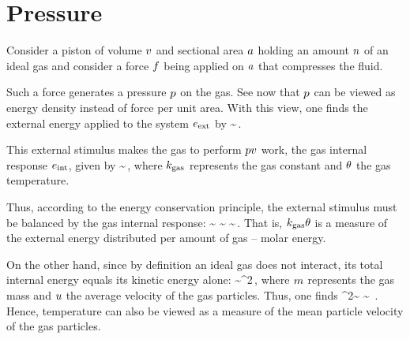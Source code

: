 \section{Pressure}
Consider a piston of volume $v$ and sectional area $a$ holding an amount $n$ of an ideal gas and consider a force $f$ being applied on $a$ that compresses the fluid. 

Such a force generates a pressure $p$ on the gas. See now that $p$ can be viewed as energy density instead of force per unit area. With this view, one finds the external energy applied to the system $e_\text{ext}$ by
\beq
\ener{}\sim\press\vol\,.
\eeq

This external stimulus makes the gas to perform $pv$ work, the gas internal response $e_\text{int}$, given by
\beq
\ener{}\sim\amount\kgas\temp\,,
\eeq
where $k_\text{gas}$ represents the gas constant and $\theta$ the gas temperature.

Thus, according to the energy conservation principle, the external stimulus must be balanced by the gas internal response:
\beq
\ener{}\sim\ener{}
              \sim\amount\kgas\temp
\implies
\kgas\temp\sim{}\,.
\eeq
That is, $k_\text{gas}\theta$ is a measure of the external energy distributed per amount of gas -- molar energy.

On the other hand, since by definition an ideal gas does not interact, its total internal energy equals its kinetic energy alone:
\beq
\ener{}\sim\mass\vel^2\,,
\eeq
where $m$ represents the gas mass and $u$ the average velocity of the gas particles. Thus, one finds
\beq
\mass\vel^2\sim\amount\kgas\temp
\implies
\temp\sim{}
     \propto\vel\,.
\eeq
Hence, temperature can also be viewed as a measure of the mean particle velocity of the gas particles.


